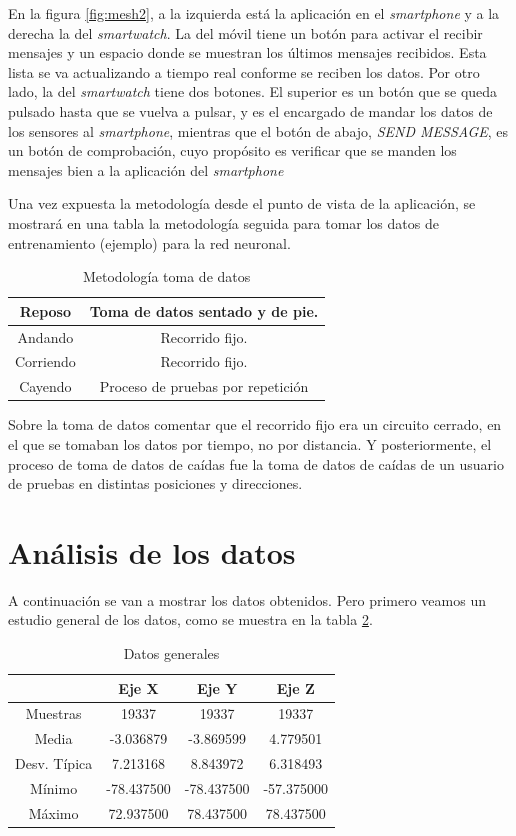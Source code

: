 \documentclass[12pt]{book}
\numberwithin{equation}{section}
\begin{document}
En la figura \ref{fig:mesh2}, a la izquierda está la aplicación en el \textit{smartphone} y a la derecha la del \textit{smartwatch}. La del móvil tiene un botón para activar el recibir mensajes y un espacio donde se muestran los últimos mensajes recibidos. Esta lista se va actualizando a tiempo real conforme se reciben los datos. Por otro lado, la del \textit{smartwatch} tiene dos botones. El superior es un botón que se queda pulsado hasta que se vuelva a pulsar, y es el encargado de mandar los datos de los sensores al \textit{smartphone}, mientras que el botón de abajo, \textit{SEND MESSAGE}, es un botón de comprobación, cuyo propósito es verificar que se manden los mensajes bien a la aplicación del \textit{smartphone}

Una vez expuesta la metodología desde el punto de vista de la aplicación, se mostrará en una tabla la metodología seguida para tomar los datos de entrenamiento (ejemplo) para la red neuronal.

\begin{table}[h]
\centering
\caption{Metodología toma de datos}
\begin{tabular}{| c | c |}
\hline
Reposo & Toma de datos sentado y de pie. \\
\hline
Andando & Recorrido fijo. \\
\hline
Corriendo & Recorrido fijo. \\
\hline
Cayendo & Proceso de pruebas por repetición \\
\hline
\end{tabular}
\label{tabla1}
\end{table}

Sobre la toma de datos comentar que el recorrido fijo era un circuito cerrado, en el que se tomaban los datos por tiempo, no por distancia. Y posteriormente, el proceso de toma de datos de caídas fue la toma de datos de caídas de un usuario de pruebas en distintas posiciones y direcciones.

\newpage
\section{Análisis de los datos}

A continuación se van a mostrar los datos obtenidos. Pero primero veamos un estudio general de los datos, como se muestra en la tabla \ref{tabla2}.
\begin{table}[h]
\centering
\caption{Datos generales}
\begin{tabular}{| c | c | c | c |}
\hline
 & Eje X & Eje Y & Eje Z \\
\hline
Muestras & 19337 & 19337 & 19337 \\
\hline
Media & -3.036879 & -3.869599 & 4.779501 \\
\hline
Desv. Típica & 7.213168 & 8.843972 & 6.318493 \\
\hline
Mínimo & -78.437500 & -78.437500 & -57.375000 \\
\hline
Máximo & 72.937500 & 78.437500 & 78.437500 \\
\hline
\end{tabular}
\label{tabla2}
\end{table}
\end{document}
